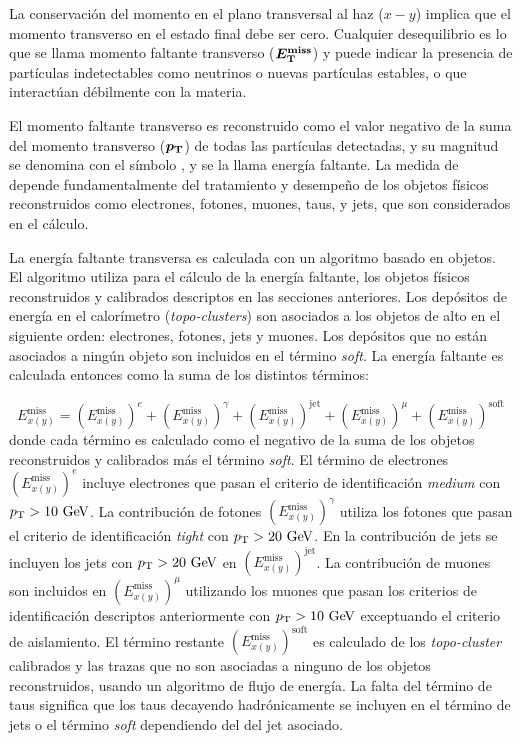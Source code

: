 La conservación del momento en el plano transversal al haz ($x-y$) implica que
el momento transverso en el estado final debe ser cero. Cualquier desequilibrio es
lo que se llama momento faltante transverso ($\bm{E_{\mathrm{T}}^{\mathrm{miss}}}$) y puede indicar la
presencia de partículas indetectables como neutrinos o nuevas partículas
estables, o que interactúan débilmente con la materia.

El momento faltante transverso es reconstruido como el valor negativo de la suma del
momento transverso ($\bm{p_{\mathrm{T}}}$) de todas las partículas detectadas, y su magnitud se
denomina con el símbolo {\met}, y se la llama energía faltante. La medida de
{\met} depende fundamentalmente del tratamiento y desempeño de los objetos
físicos reconstruidos como electrones, fotones, muones, taus, y jets, que son
considerados en el cálculo.

La energía faltante transversa es calculada con un algoritmo basado en objetos\cite{Khoo:2012749}.
El algoritmo utiliza para el cálculo de la energía faltante, los objetos físicos
reconstruidos y calibrados descriptos en las secciones anteriores. Los depósitos
de energía en el calorímetro (\emph{topo-clusters}) son asociados a los objetos de alto
{\pt} en el siguiente orden: electrones, fotones, jets y muones. Los depósitos
que no están asociados a ningún objeto son incluidos en el término \emph{soft}.
La energía faltante es calculada entonces como la suma de los distintos
términos:

\begin{equation}
  E^{\mathrm{miss}}_{x(y)} = (E^{\mathrm{miss}}_{x(y)})^e + (E^{\mathrm{miss}}_{x(y)})^\gamma + (E^{\mathrm{miss}}_{x(y)})^{\text{jet}} + (E^{\mathrm{miss}}_{x(y)})^{\mu} + (E^{\mathrm{miss}}_{x(y)})^{\mathrm{soft}}
\end{equation}
%
donde cada término es calculado como el negativo de la suma de los objetos reconstruidos y
calibrados más el término \emph{soft}.
El término de electrones $(E^{\mathrm{miss}}_{x(y)})^e$ incluye electrones que
pasan el criterio de identificación \emph{medium} con $\pt>10\gev$. La
contribución de fotones $(E^{\mathrm{miss}}_{x(y)})^{\gamma}$ utiliza los
fotones que pasan el criterio de identificación \emph{tight} con $\pt>20\gev$.
En la contribución de jets se incluyen los jets con $\pt>20\gev$ en
$(E^{\mathrm{miss}}_{x(y)})^{\text{jet}}$. La contribución de muones son
incluidos en $(E^{\mathrm{miss}}_{x(y)})^{\mu}$ utilizando los muones que pasan
los criterios de identificación descriptos anteriormente con $\pt>10\gev$
exceptuando el criterio de aislamiento. El término restante
$(E^{\mathrm{miss}}_{x(y)})^{\mathrm{soft}}$ es calculado de los \emph{topo-cluster}
calibrados y las trazas que no son asociadas a ninguno de los objetos
reconstruidos, usando un algoritmo de flujo de energía.
La falta del término de taus significa que los taus decayendo hadrónicamente se
incluyen en el término de jets o el término \emph{soft} dependiendo del {\pt} del jet
asociado.

